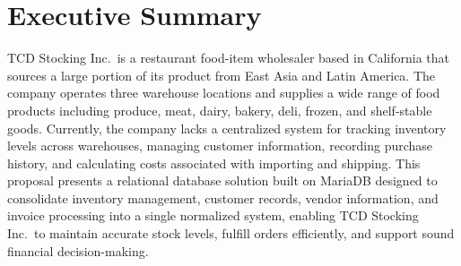 \section{Executive Summary}

TCD Stocking Inc.\ is a restaurant food-item wholesaler based in California that sources a large portion of its
product from East Asia and Latin America. The company operates three warehouse locations and supplies a wide range
of food products including produce, meat, dairy, bakery, deli, frozen, and shelf-stable goods. Currently, the
company lacks a centralized system for tracking inventory levels across warehouses, managing customer information,
recording purchase history, and calculating costs associated with importing and shipping. This proposal presents a
relational database solution built on MariaDB designed to consolidate inventory management, customer records, vendor
information, and invoice processing into a single normalized system, enabling TCD Stocking Inc.\ to maintain
accurate stock levels, fulfill orders efficiently, and support sound financial decision-making.
